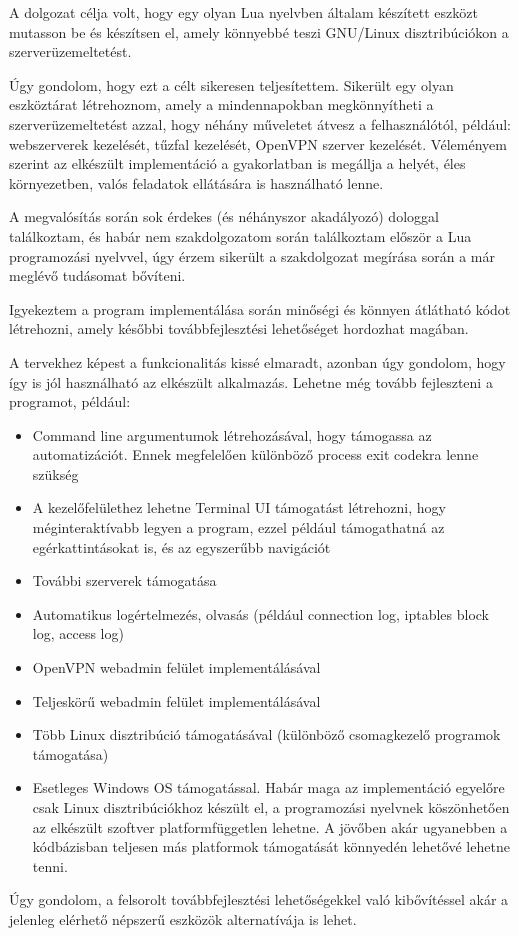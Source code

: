 
A dolgozat célja volt, hogy egy olyan Lua nyelvben általam készített eszközt mutasson be és készítsen el, amely könnyebbé teszi GNU/Linux disztribúciókon a szerverüzemeltetést.

Úgy gondolom, hogy ezt a célt sikeresen teljesítettem. Sikerült egy olyan eszköztárat létrehoznom, amely a mindennapokban megkönnyítheti a szerverüzemeltetést azzal, hogy néhány műveletet átvesz a felhasználótól, például: webszerverek kezelését, tűzfal kezelését, OpenVPN szerver kezelését. Véleményem szerint az elkészült implementáció a gyakorlatban is megállja a helyét, éles környezetben, valós feladatok ellátására is használható lenne.

A megvalósítás során sok érdekes (és néhányszor akadályozó) dologgal találkoztam, és habár nem szakdolgozatom során találkoztam először a Lua programozási nyelvvel, úgy érzem sikerült a szakdolgozat megírása során a már meglévő tudásomat bővíteni.

Igyekeztem a program implementálása során minőségi és könnyen átlátható kódot létrehozni, amely későbbi továbbfejlesztési lehetőséget hordozhat magában.

A tervekhez képest a funkcionalitás kissé elmaradt, azonban úgy gondolom, hogy így is jól használható az elkészült alkalmazás. Lehetne még tovább fejleszteni a programot, például:
\begin{itemize}
	\item Command line argumentumok létrehozásával, hogy támogassa az automatizációt. Ennek megfelelően különböző process exit codekra lenne szükség
	\item A kezelőfelülethez lehetne Terminal UI támogatást létrehozni, hogy méginteraktívabb legyen a program, ezzel például támogathatná az egérkattintásokat is, és az egyszerűbb navigációt
	\item További szerverek támogatása
	\item Automatikus logértelmezés, olvasás (például connection log, iptables block log, access log)
	\item OpenVPN webadmin felület implementálásával
	\item Teljeskörű webadmin felület implementálásával
	\item Több Linux disztribúció támogatásával (különböző csomagkezelő programok támogatása)
	\item Esetleges Windows OS támogatással. Habár maga az implementáció egyelőre csak Linux disztribúciókhoz készült el, a programozási nyelvnek köszönhetően az elkészült szoftver platformfüggetlen lehetne. A jövőben akár ugyanebben a kódbázisban teljesen más platformok támogatását könnyedén lehetővé lehetne tenni.
\end{itemize}

Úgy gondolom, a felsorolt továbbfejlesztési lehetőségekkel való kibővítéssel akár a jelenleg elérhető népszerű eszközök alternatívája is lehet.